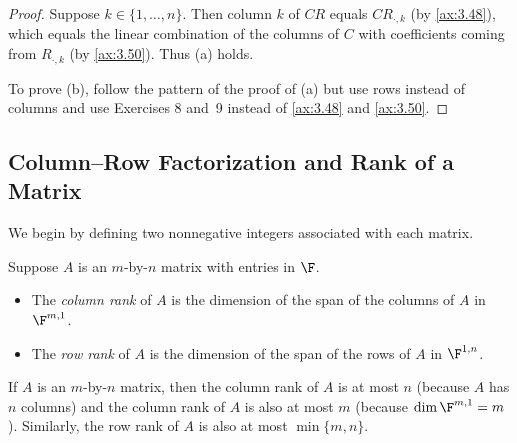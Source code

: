 \begin{proof}
Suppose $k\in\{1,\dots,n\}$. Then column $k$ of $CR$ equals $CR_{\cdot,k}$ (by
\ref{ax:3.48}), which equals the linear combination of the columns of $C$ with
coefficients coming from $R_{\cdot,k}$ (by \ref{ax:3.50}). Thus (a) holds.

To prove (b), follow the pattern of the proof of (a) but use rows instead of
columns and use Exercises 8 and~9 instead of \ref{ax:3.48} and \ref{ax:3.50}.
\end{proof}

\subsection{Column--Row Factorization and Rank of a Matrix}

We begin by defining two nonnegative integers associated with each matrix.

\begin{definition}\label{ax:3.52}
Suppose $A$ is an $m$-by-$n$ matrix with entries in $\F$.
\begin{itemize}
\item The \emph{column rank} of $A$ is the dimension of the span of the columns
  of $A$ in $\F^{m,1}$.
\item The \emph{row rank} of $A$ is the dimension of the span of the rows of
  $A$ in $\F^{1,n}$.
\end{itemize}
\end{definition}

If $A$ is an $m$-by-$n$ matrix, then the column rank of $A$ is at most $n$
(because $A$ has $n$ columns) and the column rank of $A$ is also at most $m$
(because $\dim\F^{m,1}=m$). Similarly, the row rank of $A$ is also at most
$\min\{m,n\}$.

